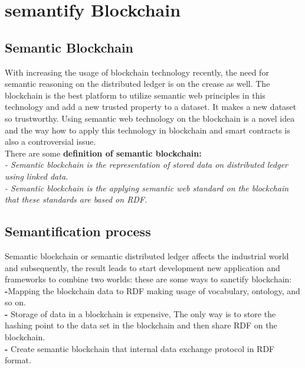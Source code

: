 \section{semantify Blockchain}
\subsection{Semantic Blockchain}
With increasing the usage of blockchain technology recently, the need for semantic reasoning on the distributed ledger is on the crease as well. The blockchain is the best platform to utilize semantic web principles in this technology and add a new trusted property to a dataset. It makes a new dataset so trustworthy. 
Using semantic web technology on the blockchain is a novel idea and the way how to apply this technology in blockchain and smart contracts is also a controversial issue.\\
There are some \textbf{definition of semantic blockchain:}\\ 
\textit{- Semantic blockchain is the representation of stored data on distributed ledger using linked data. }\\
\textit{- Semantic blockchain is the applying semantic web standard on the blockchain that these standards are based on RDF.}

\subsection{Semantification process}
Semantic blockchain or semantic distributed ledger affects the industrial world and subsequently, the result leads to start development new application and frameworks to combine two worlds:
these are some ways to sanctify blockchain:\\
\textbf{-}Mapping the blockchain data to RDF making usage of vocabulary, ontology, and so on.\\
\textbf{-} Storage of data in a blockchain is expensive, The only way is to store the hashing point to the data set in the blockchain and then share RDF on the blockchain. \\
\textbf{-} Create semantic blockchain that internal data exchange protocol in RDF format\cite{Hector}. \\

